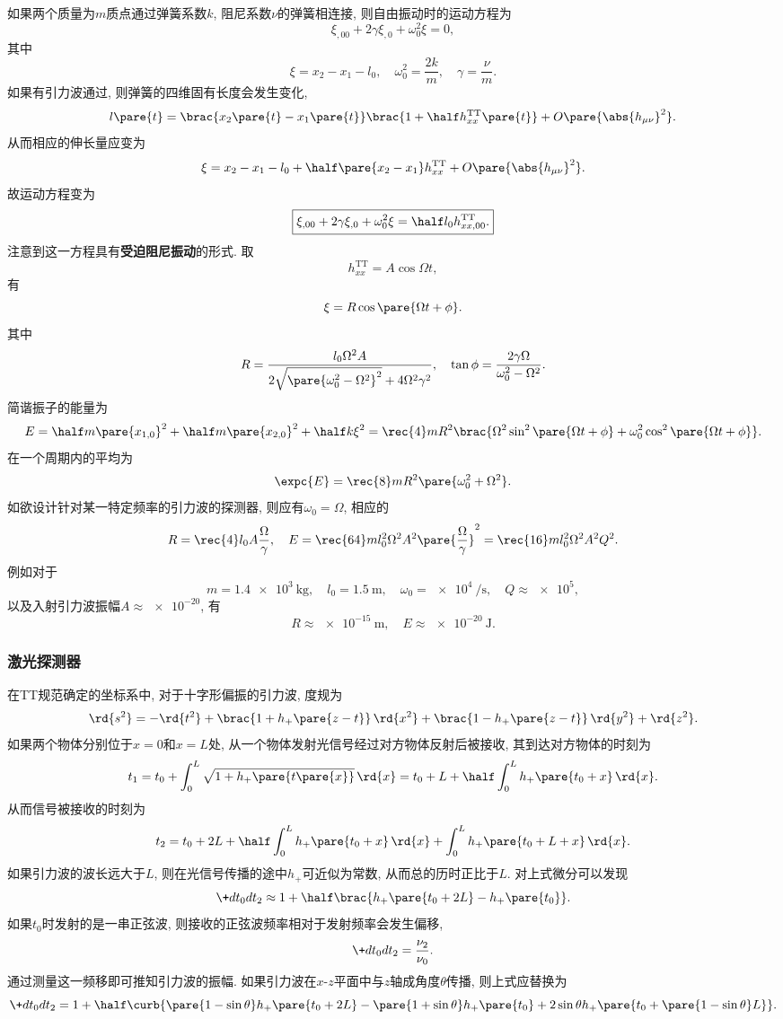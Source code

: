 \documentclass[hidelinks]{ctexart}
\begin{document}
如果两个质量为$m$质点通过弹簧系数$k$, 阻尼系数$\nu$的弹簧相连接, 则自由振动时的运动方程为
\[ \xi_{,00} + 2\gamma \xi_{,0} + \omega_0^2 \xi = 0, \]
其中
\[ \xi = x_2 - x_1 - l_0,\quad \omega_0^2 = \frac{2k}{m},\quad \gamma = \frac{\nu}{m}. \]
如果有引力波通过, 则弹簧的四维固有长度会发生变化,
\[ l\pare{t} = \brac{x_2\pare{t} - x_1\pare{t}}\brac{1+\half h^{\mathrm{TT}}_{xx}\pare{t}} + O\pare{\abs{h_{\mu\nu}}^2}. \]
从而相应的伸长量应变为
\[ \xi = x_2 - x_1 - l_0 + \half \pare{x_2 - x_1} h_{xx}^{\mathrm{TT}} + O\pare{\abs{h_{\mu\nu}}^2}. \]
故运动方程变为
\[ \boxed{\xi_{,00} + 2\gamma \xi_{,0} + \omega_0^2 \xi = \half l_0 h^{\mathrm{TT}}_{xx,00}.} \]
注意到这一方程具有\textbf{受迫阻尼振动}的形式. 取
\[ h_{xx}^{\mathrm{TT}} = A\cos \Omega t, \]
有
\[ \xi = R\cos\pare{\Omega t + \phi}. \]
其中
\[ R = \frac{l_0 \Omega^2 A}{2\sqrt{\pare{\omega_0^2 - \Omega^2}^2} + 4\Omega^2\gamma^2},\quad \tan\phi = \frac{2\gamma \Omega}{\omega_0^2 - \Omega^2}. \]
简谐振子的能量为
\[ E = \half m\pare{x_{1,0}}^2 + \half m\pare{x_{2,0}}^2 + \half k\xi^2 = \rec{4}mR^2 \brac{\Omega^2 \sin^2\pare{\Omega t + \phi} + \omega_0^2 \cos^2\pare{\Omega t + \phi}}. \]
在一个周期内的平均为
\[ \expc{E} = \rec{8}mR^2 \pare{\omega_0^2 + \Omega^2}. \]
如欲设计针对某一特定频率的引力波的探测器, 则应有$\omega_0 = \Omega$, 相应的
\[ R = \rec{4}l_0 A \frac{\Omega}{\gamma},\quad E = \rec{64}ml_0^2 \Omega^2 A^2\pare{\frac{\Omega}{\gamma}}^2 = \rec{16}ml_0^2\Omega^2 A^2Q^2. \]
例如对于
\[ m = \SI{1.4e3}{\kilogram},\quad l_0 = \SI{1.5}{\meter},\quad \omega_0 = \SI{e4}{\per\second},\quad Q \approx \num{e5}, \]
以及入射引力波振幅$A \approx \num{e-20}$, 有
\[ R\approx \SI{e-15}{\meter},\quad E \approx \SI{e-20}{\joule}. \]


\subsubsection{激光探测器} %
\label{ssub:激光探测器}

在TT规范确定的坐标系中, 对于十字形偏振的引力波, 度规为
\[ \rd{s^2} = -\rd{t^2} + \brac{1+h_+\pare{z-t}}\,\rd{x^2} + \brac{1-h_+\pare{z-t}}\,\rd{y^2} + \rd{z^2}. \]
如果两个物体分别位于$x=0$和$x=L$处, 从一个物体发射光信号经过对方物体反射后被接收, 其到达对方物体的时刻为
\[ t_1 = t_0 + \int_0^L \sqrt{1+h_+\pare{t\pare{x}}}\,\rd{x} = t_0 + L + \half \int_0^L h_+\pare{t_0 + x}\,\rd{x}. \]
从而信号被接收的时刻为
\[ t_2 = t_0 + 2L + \half \int_0^L h_+\pare{t_0 + x}\,\rd{x} + \int_0^L h_+\pare{t_0 + L + x}\,\rd{x}. \]
如果引力波的波长远大于$L$, 则在光信号传播的途中$h_+$可近似为常数, 从而总的历时正比于$L$. 对上式微分可以发现
\[ \+d{t_0}d{t_2} \approx 1 + \half \brac{h_+\pare{t_0 + 2L} - h_+\pare{t_0}}. \]
如果$t_0$时发射的是一串正弦波, 则接收的正弦波频率相对于发射频率会发生偏移,
\[ \+d{t_0}d{t_2} = \frac{\nu_2}{\nu_0}. \]
通过测量这一频移即可推知引力波的振幅. 如果引力波在$x$-$z$平面中与$z$轴成角度$\theta$传播, 则上式应替换为
\begin{equation}
    \label{eq:ThreeItems}
    \+d{t_0}d{t_2} = 1 + \half \curb{\pare{1-\sin\theta}h_+\pare{t_0 + 2L} - \pare{1+\sin\theta}h_+\pare{t_0} + 2\sin\theta h_+\pare{t_0 + \pare{1-\sin\theta} L}}.
\end{equation}
\end{document}
